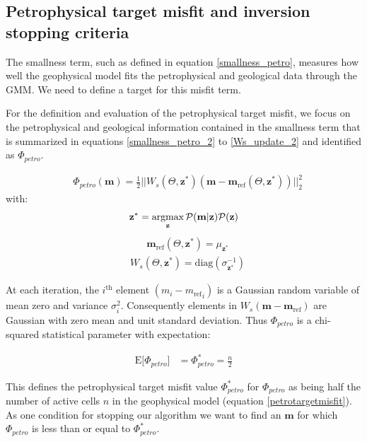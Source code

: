 \documentclass[extra]{gji} %
\begin{document}
\subsection{Petrophysical target misfit and inversion stopping criteria} \label{section:stopping}

The smallness term, such as defined in equation \ref{smallness_petro}, measures how well the geophysical model fits the petrophysical and geological data through the GMM. We need to define a target for this misfit term.

For the definition and evaluation of the petrophysical target misfit, we  focus on the petrophysical and geological information contained in the smallness term that is summarized in equations \ref{smallness_petro_2} to \ref{Ws_update_2} and identified as $\Phi_{petro}$.

\begin{align}
&\Phi_{petro}(\mathbf{m}) = \frac{1}{2}||W_{s}(\Theta, \mathbf{z}^*)(\mathbf{m}-\mathbf{m}_{\text{ref}}(\Theta, \mathbf{z}^*))||_2^2 \label{smallness_petro_2}
\end{align}
with:
\begin{align}
&\mathbf{z^*} = \mathop{\hbox{argmax}}\limits_{\mathbf{z}}\mathcal{P}(\mathbf{m}|\mathbf{z})\mathcal{P}(\mathbf{z}) \label{membership_2} \\
\end{align}
\begin{align}
&\mathbf{m}_{\text{ref}}(\Theta, \mathbf{z}^*) = {\mu}_{\mathbf{z}^*} \label{mref_update_2}
\end{align}
\begin{align}
&W_{s}(\Theta, \mathbf{z}^*) = \text{diag}({\sigma_{\mathbf{z}^*}^{-1}}) \label{Ws_update_2}
\end{align}

At each iteration, the $i^{\text{th}}$ element $(m_i-{m_{\text{ref}}}_i)$ is a Gaussian random variable of mean zero and variance $\sigma_i^2$. Consequently elements in $W_s(\mathbf{m}-\mathbf{m}_{\text{ref}})$ are Gaussian with zero mean and unit standard deviation. Thus $\Phi_{petro}$ is a chi-squared statistical parameter with expectation:

\begin{align}
\text{E}\lbrack\Phi_{petro}\rbrack &= \Phi_{petro}^* = \frac{n}{2} \label{petrotargetmisfit}
\end{align}

This defines the petrophysical target misfit value $\Phi_{petro}^*$ for $\Phi_{petro}$ as being half the number of active cells $n$ in the geophysical model (equation \ref{petrotargetmisfit}). As one condition for stopping our algorithm we want to find an $\mathbf{m}$ for which $\Phi_{petro}$ is less than or equal to $\Phi_{petro}^*$.
\end{document}
